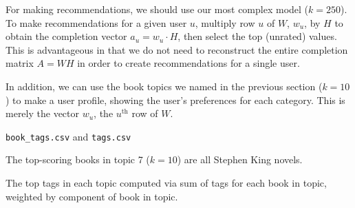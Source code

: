 \documentclass[11pt]{article}
\begin{document}
For making recommendations, we should use our most complex model ($k=250$). To make recommendations for a given user $u$, multiply row $u$ of $W$, $w_u$, by $H$ to obtain the completion vector $a_u = w_u \cdot H$, then select the top (unrated) values.
This is advantageous in that we do not need to reconstruct the entire completion matrix $A = WH$ in order to create recommendations for a single user.

In addition, we can use the book topics we named in the previous section ($k=10$) to make a user profile, showing the user's preferences for each category.
This is merely the vector $w_u$, the $u^{\text{th}}$ row of $W$.

\begin{table}[h]
\centering
\caption[\texttt{book\_tags.csv} and \texttt{tags.csv}]{\texttt{book\_tags.csv} and \texttt{tags.csv}}
\label{tab:tags-csv}
\begin{subtable}[l]{0.45\linewidth}
 \centering
 
    \label{tab:book-tags}
\end{subtable}%
\begin{subtable}[r]{0.45\linewidth}
 \centering
  
    \label{tab:tags}
\end{subtable}
\end{table}


\begin{table}[h]
\centering
  
  \caption[Stephen King ($k=10$)]{The top-scoring books in topic 7 ($k=10$) are all Stephen King novels.}
  \label{tab:stephen-king-10}
\end{table}



\begin{table}[p]
\centering
  \caption[Top Tags ($k=10$)]{The top tags in each topic computed via sum of tags for each book in topic, weighted by component of book in topic.}
  \label{tab:top-tags}
\begin{subtable}[t]{\linewidth}
\centering
 
\end{subtable}

  \par\medskip

\begin{subtable}[b]{\linewidth}
\centering
  
\end{subtable}
\end{table}
\end{document}
